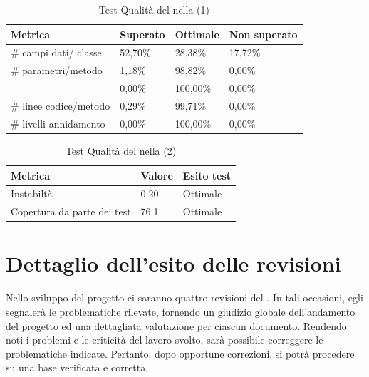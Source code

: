 \documentclass[12pt,a4paper]{article}
\begin{document}
		\begin{table}[H]
			\begin{center}
				\begin{tabular}{p{} p{0.24\textwidth} p{}p{}}
					\midrule
						\textbf{Metrica} & \textbf{Superato} & \textbf{Ottimale} & \textbf{ Non superato} \\ \midrule\midrule
						\# campi dati/ classe & 52,70\% & 28,38\% & 17,72\% \\\midrule
						\# parametri/metodo & 1,18\% & 98,82\% & 0,00\% \\\midrule
						\mgls{complessità ciclomatica} & 0,00\% & 100,00\% & 0,00\% \\\midrule
						\# linee codice/metodo & 0,29\% & 99,71\% & 0,00\% \\\midrule
						\# livelli annidamento & 0,00\% & 100,00\% & 0,00\% \\\midrule
			
				\end{tabular}	
			\end{center}
			\caption{Test Qualità del  nella \FC (1)}
		\end{table}
			\begin{table}[H]
				\begin{center}
					\begin{tabular}{p{} p{0.3\textwidth} p{}}
						\midrule
						\textbf{Metrica} & \textbf{Valore} & \textbf{Esito test}  \\ \midrule\midrule
						Instabiltà & 0.20  &  Ottimale  \\\midrule
						Copertura da parte dei test & 76.1  & Ottimale \\ \midrule
					\end{tabular}	
				\end{center}
				\caption{Test Qualità del  nella \FC (2)}
			\end{table}
	
	
	\newpage
	\section{Dettaglio dell'esito delle revisioni}
	Nello sviluppo del progetto ci saranno quattro revisioni del . In tali occasioni, egli segnalerà le problematiche rilevate, fornendo un giudizio globale dell'andamento del progetto ed una dettagliata valutazione per ciascun documento. Rendendo noti i problemi e le criticità del lavoro svolto, sarà possibile correggere le problematiche indicate. Pertanto, dopo opportune correzioni, si potrà procedere su una base verificata e corretta.
	
\end{document}
